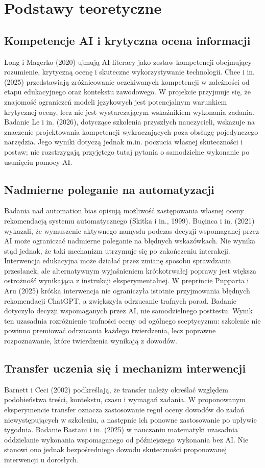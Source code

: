 \documentclass[11pt,a4paper]{article}
\begin{document}
\section{Podstawy teoretyczne}
\subsection{Kompetencje AI i krytyczna ocena informacji}
Long i Magerko (2020) ujmują AI literacy jako zestaw kompetencji obejmujący rozumienie, krytyczną ocenę i skuteczne wykorzystywanie technologii. Chee i in. (2025) przedstawiają zróżnicowanie oczekiwanych kompetencji w zależności od etapu edukacyjnego oraz kontekstu zawodowego. W projekcie przyjmuje się, że znajomość ograniczeń modeli językowych jest potencjalnym warunkiem krytycznej oceny, lecz nie jest wystarczającym wskaźnikiem wykonania zadania. Badanie Le i in. (2026), dotyczące szkolenia przyszłych nauczycieli, wskazuje na znaczenie projektowania kompetencji wykraczających poza obsługę pojedynczego narzędzia. Jego wyniki dotyczą jednak m.in. poczucia własnej skuteczności i postaw; nie rozstrzygają przyjętego tutaj pytania o samodzielne wykonanie po usunięciu pomocy AI.

\subsection{Nadmierne poleganie na automatyzacji}
Badania nad automation bias opisują możliwość zastępowania własnej oceny rekomendacją systemu automatycznego (Skitka i in., 1999). Buçinca i in. (2021) wykazali, że wymuszenie aktywnego namysłu podczas decyzji wspomaganej przez AI może ograniczać nadmierne poleganie na błędnych wskazówkach. Nie wynika stąd jednak, że taki mechanizm utrzymuje się po zakończeniu interakcji. Interwencja edukacyjna może działać przez zmianę sposobu sprawdzania przesłanek, ale alternatywnym wyjaśnieniem krótkotrwałej poprawy jest większa ostrożność wynikająca z instrukcji eksperymentalnej. W preprincie Pupparta i Aru (2025) krótka interwencja nie ograniczyła istotnie przyjmowania błędnych rekomendacji ChatGPT, a zwiększyła odrzucanie trafnych porad. Badanie dotyczyło decyzji wspomaganych przez AI, nie samodzielnego posttestu. Wynik ten uzasadnia rozróżnienie trafności oceny od ogólnego sceptycyzmu: szkolenie nie powinno premiować odrzucania każdego twierdzenia, lecz poprawne rozpoznawanie, które twierdzenia wynikają z dowodów.

\subsection{Transfer uczenia się i mechanizm interwencji}
Barnett i Ceci (2002) podkreślają, że transfer należy określać względem podobieństwa treści, kontekstu, czasu i wymagań zadania. W proponowanym eksperymencie transfer oznacza zastosowanie reguł oceny dowodów do zadań niewystępujących w szkoleniu, a następnie ich ponowne zastosowanie po upływie tygodnia. Badanie Bastani i in. (2025) w nauczaniu matematyki uzasadnia oddzielanie wykonania wspomaganego od późniejszego wykonania bez AI. Nie stanowi ono jednak bezpośredniego dowodu skuteczności proponowanej interwencji u dorosłych.
\end{document}
